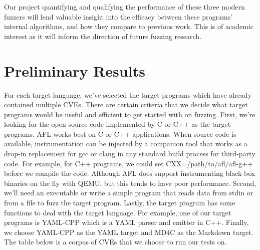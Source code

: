 \documentclass[12pt]{diazessay}
\begin{document}
Our project quantifying and qualifying the performance of these three modern fuzzers will lend valuable insight into the efficacy between these programs' internal algorithms, and how they compare to previous work.
This is of academic interest as it will inform the direction of future fuzzing research.


\vspace{4mm}
\section*{Preliminary Results}
\label{results}

For each target language, we’ve selected the target programs which have already contained multiple CVEs. There are certain criteria that we decide what target programs would be useful and efficient to get started with on fuzzing.  First, we’re looking for the open source code implemented by C or C++ as the target programs.  AFL works best on C or C++ applications. When source code is available, instrumentation can be injected by a companion tool that works as a drop-in replacement for gcc or clang in any standard build process for third-party code. For example, for C++ programs, we could set CXX=/path/to/afl/afl-g++ before we compile the code. Although AFL does support instrumenting black-box binaries on the fly with QEMU, but this tends to have poor performance. Second, we’ll need an executable or write a simple program that reads data from stdin or from a file to fuzz the target program. Lastly, the target program has some functions to deal with the target language. For example, one of our target programs is YAML-CPP which is a YAML parser and emitter in C++. Finally, we choose YAML-CPP as the YAML target and MD4C as the Markdown target.
The table below is a corpus of CVEs that we choose to run our tests on.
\end{document}
